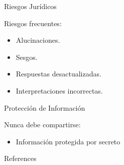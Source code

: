 \documentclass[aspectratio=169]{beamer}
\begin{document}
\begin{frame}{Riesgos Jurídicos}


Riesgos frecuentes:

\begin{itemize}
  \item Alucinaciones.
  \item Sesgos.
  \item Respuestas desactualizadas.
  \item Interpretaciones incorrectas.
\end{itemize}
\end{frame}

\begin{frame}{Protección de Información}


Nunca debe compartirse:

\begin{itemize}
  \item Información protegida por secreto
\end{itemize}
\end{frame}



\begin{frame}[allowframebreaks]{References}
  
  
\end{frame}
\end{document}
